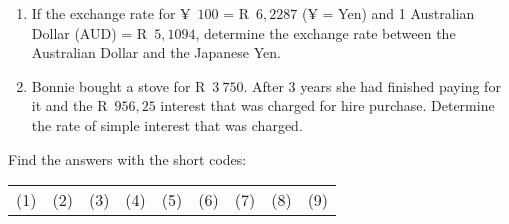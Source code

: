 \begin{eocexercises}{}
\begin{enumerate}[label=\textbf{\arabic*}.]
	\item If the exchange rate for ¥~$100$ = R~$6,2287$ (¥ = Yen) and 1 Australian Dollar (AUD) = R~$5,1094$, determine the exchange rate between the Australian Dollar and the Japanese Yen.

	\item Bonnie bought a stove for R~$3~750$. After 3 years she had finished paying for it and the R~$956,25$ interest that was charged for hire purchase. Determine the rate of simple interest that was charged.
    \end{enumerate}
\practiceinfo
    Find the answers with the short codes:\\
    \begin{tabularx}{\textwidth}{ XXXXXXXXX }
	(1) & (2) & (3) & (4) & (5) & (6) & (7) & (8) & (9)\\
    \end{tabularx}
\end{eocexercises}

